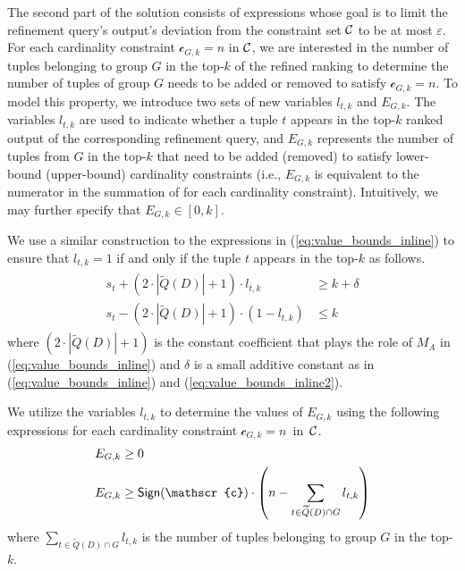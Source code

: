 The second part of the solution consists of expressions whose goal is to limit the refinement query's output's deviation from the constraint set $\mathcal{C}$ to be at most $\varepsilon$. For each cardinality constraint $\mathscr{c}_{G, k} = n$ in $\mathcal{C}$, we are interested in the number of tuples belonging to group $G$ in the top-$k$ of the refined ranking to determine the number of tuples of group $G$ needs to be added or removed to satisfy $\mathscr{c}_{G, k} = n$.
To model this property, we introduce two sets of new variables $l_{t, k}$ and $E_{G, k}$. The variables $l_{t, k}$ are used to indicate whether a tuple $t$ appears in the top-$k$ ranked output of the corresponding refinement query, and $E_{G, k}$ represents the number of tuples from $G$ in the top-$k$ that need to be added (removed) to satisfy lower-bound (upper-bound) cardinality constraints (i.e., $E_{G, k}$ is equivalent to the numerator in the summation of  for each cardinality constraint). Intuitively, we may further specify that $E_{G, k} \in [0, k]$. 

We use a similar construction to the expressions in (\ref{eq:value_bounds_inline}) to ensure that $l_{t, k} = 1$ if and only if the tuple $t$ appears in the top-$k$ as follows.
\begin{align}
\begin{split}
    s_t + (2 \cdot |\widetilde{Q}(D)| + 1) \cdot l_{t, k} &\geq k + \delta \label{eq:in_prefix_inline} \\
    s_t - (2 \cdot |\widetilde{Q}(D)| + 1) \cdot (1 - l_{t, k}) &\leq k
\end{split}
\end{align}
where $(2 \cdot |\widetilde{Q}(D)| + 1)$ is the constant coefficient that plays the role of $M_A$ in (\ref{eq:value_bounds_inline}) and $\delta$ is a small additive constant as in (\ref{eq:value_bounds_inline}) and (\ref{eq:value_bounds_inline2}). 

We utilize the variables $l_{t, k}$ to determine the values of $E_{G, k}$ using the following expressions for each cardinality constraint $\mathscr{c}_{G, k} = n$~in~$\mathcal{C}$.
\begin{align}
\begin{split}
E_{G, k} &\geq 0 \label{eq:tuples_to_satisfy_inline} \\
E_{G, k} &\geq \sign(\mathscr{c}) \cdot \left (n - \sum_{t \in \widetilde{Q}(D)\cap G} l_{t, k} \right)
\end{split}
\end{align}
where $\sum_{t \in \widetilde{Q}(D)\cap G} l_{t, k}$ is the number of tuples belonging to group $G$ in the top-$k$.

